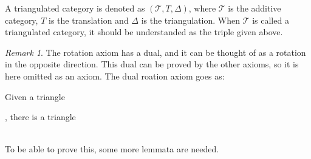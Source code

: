 \documentclass[12pt]{article}
\theoremstyle{definition}
\theoremstyle{remark}
\newtheorem*{remark}{Remark}
\begin{document}
            A triangulated category is denoted as $(\mathcal{T}, T, \Delta)$, where $\mathcal{T}$ is the additive category, $T$ is the translation and $\Delta$ is the triangulation. When $\mathcal{T}$ is called a triangulated category, it should be understanded as the triple given above.
            \begin{remark}
                The rotation axiom has a dual, and it can be thought of as a rotation in the opposite direction. This dual can be proved by the other axioms, so it is here omitted as an axiom. The dual roation axiom goes as:

                Given a triangle , there is a triangle  \\ %
                To be able to prove this, some more lemmata are needed.
            \end{remark}
\end{document}
